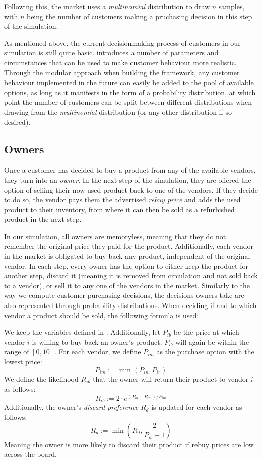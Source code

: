 Following this, the market uses a \emph{multinomial} distribution to draw \(n\) samples, with \(n\) being the number of customers making a pruchasing decision in this step of the simulation.

As mentioned above, the current decisionmaking process of customers in our simulation is still quite basic.  introduces a number of parameters and circumstances that can be used to make customer behaviour more realistic. Through the modular approach when building the framework, any customer behaviour implemented in the future can easily be added to the pool of available options, as long as it manifests in the form of a probability distribution, at which point the number of customers can be split between different distributions when drawing from the \emph{multinomial} distribution (or any other distribution if so desired).

\subsection{Owners}

Once a customer has decided to buy a product from any of the available vendors, they turn into an \emph{owner}. In the next step of the simulation, they are offered the option of selling their now used product back to one of the vendors. If they decide to do so, the vendor pays them the advertised \emph{rebuy price} and adds the used product to their inventory, from where it can then be sold as a refurbished product in the next step.

In our simulation, all owners are memoryless, meaning that they do not remember the original price they paid for the product. Additionally, each vendor in the market is obligated to buy back any product, independent of the original vendor. In each step, every owner has the option to either keep the product for another step, discard it (meaning it is removed from circulation and not sold back to a vendor), or sell it to any one of the vendors in the market. Similarly to the way we compute customer purchasing decisions, the decisions owners take are also represented through probability distributions. When deciding if and to which vendor a product should be sold, the following formula is used:

\pagebreak
\begin{definition}\label{def:ownerDecisions}
	We keep the variables defined in . Additionally, let \(P_{ib}\) be the price at which vendor \(i\) is willing to buy back an owner's product. \(P_{ib}\) will again be within the range of \([0,10]\). For each vendor, we define \(P_{im}\) as the purchase option with the lowest price:
	\[
		P_{im} := \min(P_{in}, P_{ir})
	\]
	We define the likelihood \(R_{ib}\) that the owner will return their product to vendor \(i\) as follows:
	\[
		R_{ib} := 2 \cdot e^{(P_{ib} - P_{im}) / P_{im}}
	\]
	Additionally, the owner's \emph{discard preference} \(R_{d}\) is updated for each vendor as follows:
	\[
		R_{d} := \min({R_{d}, \frac{2}{P_{ib}+1}})
	\]
	Meaning the owner is more likely to discard their product if rebuy prices are low across the board.
\end{definition}

